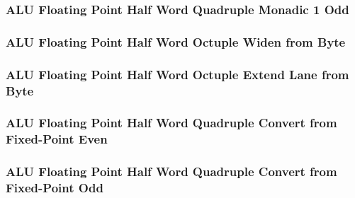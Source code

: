 

\subsubsection[{\small ALU Floating Point Half Word Quadruple Monadic 1 Odd}]{ALU Floating Point Half Word Quadruple Monadic 1 Odd} \label{sec:format-ALU-FHQMO1O}



\subsubsection[{\small ALU Floating Point Half Word Octuple Widen from Byte}]{ALU Floating Point Half Word Octuple Widen from Byte} \label{sec:format-ALU-FHOWIDENWR}



\subsubsection[{\small ALU Floating Point Half Word Octuple Extend Lane from Byte}]{ALU Floating Point Half Word Octuple Extend Lane from Byte} \label{sec:format-ALU-FHOEXTLWR}



\subsubsection[{\small ALU Floating Point Half Word Quadruple Convert from Fixed-Point Even}]{ALU Floating Point Half Word Quadruple Convert from Fixed-Point Even} \label{sec:format-ALU-FHQFLOATE}



\subsubsection[{\small ALU Floating Point Half Word Quadruple Convert from Fixed-Point Odd}]{ALU Floating Point Half Word Quadruple Convert from Fixed-Point Odd} \label{sec:format-ALU-FHQFLOATO}

